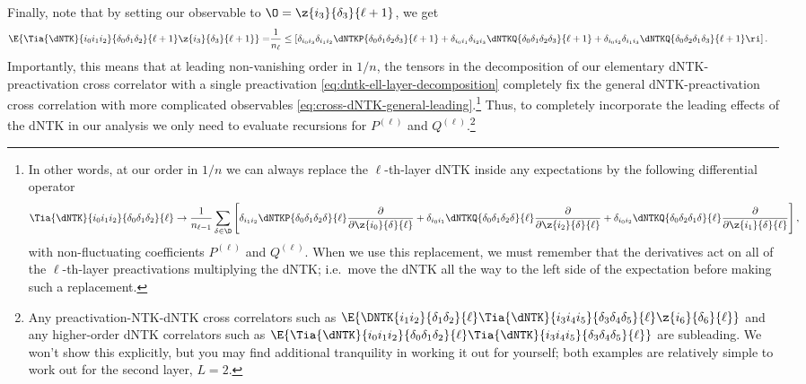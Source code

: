 Finally, note that by setting our observable to $\O = \z{i_3}{\delta_3}{\ell+1}$, we get
\begin{align}\label{eq:dntk-ell-layer-decomposition}
\E{\Tia{\dNTK}{i_0i_1i_2}{\delta_0\delta_1\delta_2}{\ell+1}\z{i_3}{\delta_3}{\ell+1}}=&\frac{1}{n_{\ell}}\le[\delta_{i_0 i_3}\delta_{i_1i_2}\dNTKP{\delta_0\delta_1\delta_2\delta_3}{\ell+1}+\delta_{i_0i_1}\delta_{i_2i_3}\dNTKQ{\delta_0\delta_1\delta_2\delta_3}{\ell+1}+\delta_{i_0i_2}\delta_{i_1i_3}\dNTKQ{\delta_0\delta_2\delta_1\delta_3}{\ell+1}\ri]\, .
\end{align}
Importantly, this means that at leading non-vanishing order in $1/n$, the tensors in the decomposition of our elementary dNTK-preactivation cross correlator with a single preactivation \eqref{eq:dntk-ell-layer-decomposition} completely fix the general dNTK-preactivation cross correlation 
with more complicated observables \eqref{eq:cross-dNTK-general-leading}.\footnote{In other words, at our order in $1/n$
we can always replace the $\ell$-th-layer dNTK inside any expectations by the following differential operator
\begin{align}\label{eq:cross-dNTK-general-leading-operator}
\Tia{\dNTK}{i_0i_1i_2}{\delta_0\delta_1\delta_2}{\ell}\to \frac{1}{n_{\ell-1}}\sum_{\delta_{}\in\D}\Bigg[\delta_{i_1i_2}\dNTKP{\delta_0\delta_1\delta_2\delta_{}}{\ell}\frac{\partial}{\partial \z{i_0}{\delta_{}}{\ell}}+\delta_{i_0i_1}\dNTKQ{\delta_0\delta_1\delta_2\delta_{}}{\ell}\frac{\partial}{\partial \z{i_2}{\delta_{}}{\ell}}+\delta_{i_0i_2} \dNTKQ{\delta_0\delta_2\delta_1\delta_{}}{\ell}\frac{\partial}{\partial \z{i_1}{\delta_{}}{\ell}}\Bigg]\, ,
\end{align}
with non-fluctuating coefficients $P^{(\ell)}$ and $Q^{(\ell)}$. When we use this replacement, we must remember that the derivatives act on all of the $\ell$-th-layer preactivations multiplying the dNTK; i.e.~move the dNTK all the way to the left side of the expectation before making such a replacement.}
Thus, to completely incorporate the leading effects of the dNTK in our analysis we only need to evaluate recursions for $P^{(\ell)}$ and $Q^{(\ell)}$.\footnote{
     Any preactivation-NTK-dNTK cross correlators such as $\E{\DNTK{i_1i_2}{\delta_1\delta_2}{\ell} \Tia{\dNTK}{i_3i_4i_5}{\delta_3\delta_4\delta_5}{\ell}\z{i_6}{\delta_6}{\ell}}$     
      and any higher-order dNTK correlators such as  $\E{ \Tia{\dNTK}{i_0i_1i_2}{\delta_0\delta_1\delta_2}{\ell} \Tia{\dNTK}{i_3i_4i_5}{\delta_3\delta_4\delta_5}{\ell}}$ are subleading. We won't show this explicitly, but you may find additional tranquility in working it out for yourself;
     both examples are relatively simple to work out for the second layer, $L = 2$.
}

